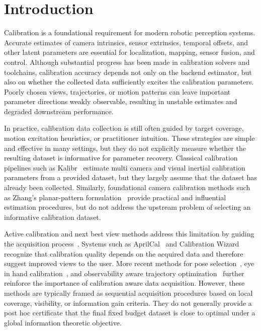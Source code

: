 \documentclass[letterpaper, 9
 pt, conference]{ieeeconf}
\begin{document}
\section{Introduction}
    Calibration is a foundational requirement for modern robotic perception systems.
Accurate estimates of camera intrinsics, sensor extrinsics, temporal offsets, and
other latent parameters are essential for localization, mapping, sensor fusion,
and control. Although substantial progress has been made in calibration solvers
and toolchains, calibration accuracy depends not only on the backend estimator,
but also on whether the collected data sufficiently excites the calibration
parameters. Poorly chosen views, trajectories, or motion patterns can leave
important parameter directions weakly observable, resulting in unstable estimates
and degraded downstream performance.

In practice, calibration data collection is still often guided by target
coverage, motion excitation heuristics, or practitioner intuition. These
strategies are simple and effective in many settings, but they do not explicitly
measure whether the resulting dataset is informative for parameter recovery.
Classical calibration pipelines such as Kalibr~\citep{furgale2013kalibr,kalibr_toolbox} estimate multi camera and
visual inertial calibration parameters from a provided dataset, but they largely
assume that the dataset has already been collected. Similarly, foundational
camera calibration methods such as Zhang's planar-pattern formulation~\citep{zhang2000flexible} provide
practical and influential estimation procedures, but do not address the upstream
problem of selecting an informative calibration dataset.

Active calibration and next best view methods address this limitation by
guiding the acquisition process~\citep{active_calib_1,active_calib_2}. Systems such as AprilCal~\citep{richardson2013aprilcal} and Calibration Wizard~\citep{peng2019calibration}
recognize that calibration quality depends on the acquired data and therefore
suggest improved views to the user. More recent methods for pose selection~\citep{rojtberg2018efficient},
eye in hand calibration~\citep{tsai1989new,yang2023nbv}, and observability aware trajectory optimization~\citep{schneider2019observability} further
reinforce the importance of calibration aware data acquisition. However, these
methods are typically framed as sequential acquisition procedures based on local
coverage, visibility, or information gain criteria. They do not generally provide
a post hoc certificate that the final fixed budget dataset is close to optimal
under a global information theoretic objective.
\end{document}
